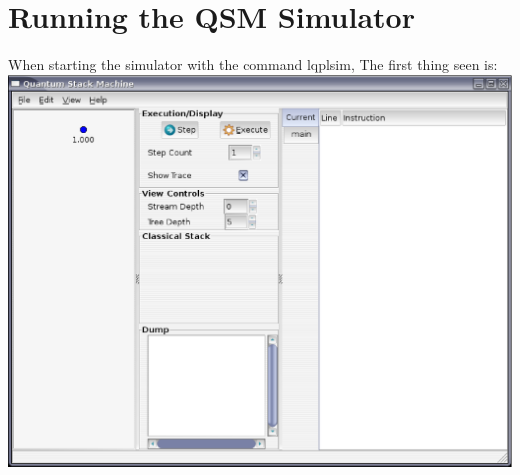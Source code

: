\section{Running the QSM Simulator}\label{appsec:runningsimulator}

When starting the simulator with the command lqplsim,
The first thing seen is:
\includegraphics[scale=.5]{images/QSM.startup.eps}
